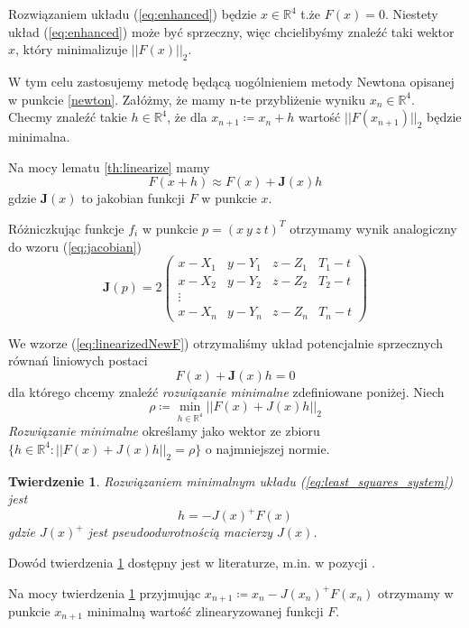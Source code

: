 \documentclass{article}
\newtheorem{theorem}{Twierdzenie}
\begin{document}
Rozwiązaniem układu (\ref{eq:enhanced}) będzie $x \in \mathbb{R}^4$ t.że $F(x) = 0$. Niestety układ (\ref{eq:enhanced})
może być sprzeczny, więc chcielibyśmy znaleźć taki wektor $x$, który minimalizuje $||F(x)||_2$.

W tym celu zastosujemy metodę będącą uogólnieniem metody Newtona opisanej w punkcie \ref{newton}.
Załóżmy, że mamy n-te przybliżenie wyniku $x_n \in \mathbb{R}^4$. Checmy znaleźć takie $h \in \mathbb{R}^4$,
że dla $x_{n+1} \coloneqq x_n + h$ wartość $||F(x_{n+1})||_2$ będzie minimalna.

Na mocy lematu \ref{th:linearize} mamy
\begin{equation}
    \label{eq:linearizedNewF}
    F(x + h) \approx F(x) + \mathbf{J}(x)h
\end{equation}
gdzie $\mathbf{J}(x)$ to jakobian funkcji $F$ w punkcie $x$.

Różniczkując funkcje $f_i$ w punkcie $p = (x \ y \ z \ t)^T$ otrzymamy wynik analogiczny do wzoru (\ref{eq:jacobian})
\[
\mathbf{J}(p) = 2
\begin{pmatrix}
    x-X_1  & y-Y_1 & z-Z_1 & T_1-t \\
    x-X_2  & y-Y_2 & z-Z_2 & T_2-t \\
    \vdots \\
    x-X_n  & y-Y_n & z-Z_n & T_n-t
\end{pmatrix}
\]

We wzorze (\ref{eq:linearizedNewF}) otrzymaliśmy układ potencjalnie sprzecznych równań liniowych postaci
\begin{equation}
    \label{eq:least_squares_system}
    F(x) + \mathbf{J}(x)h = 0
\end{equation}
dla którego chcemy znaleźć \textit{rozwiązanie minimalne} zdefiniowane poniżej. Niech
\[
    \rho \coloneqq \min_{h \in \mathbb{R}^4} ||F(x) + J(x)h||_2
\]
\textit{Rozwiązanie minimalne} określamy jako wektor ze zbioru $\{ h \in \mathbb{R}^4 : ||F(x) + J(x)h||_2 = \rho\}$
o najmniejszej normie.

\begin{theorem}
    \label{th:min_solution}
    Rozwiązaniem minimalnym układu (\ref{eq:least_squares_system}) jest
\[
    h = -J(x)^{+}F(x)
\]
gdzie $J(x)^{+}$ jest pseudoodwrotnością macierzy $J(x)$.
\end{theorem}
Dowód twierdzenia \ref{th:min_solution} dostępny jest w literaturze, m.in. w pozycji \cite{kincaid}.

Na mocy twierdzenia \ref{th:min_solution} przyjmując $x_{n+1} \coloneqq x_n -J(x_n)^{+}F(x_n)$ otrzymamy w
punkcie $x_{n+1}$ minimalną wartość zlinearyzowanej funkcji $F$.
\end{document}

